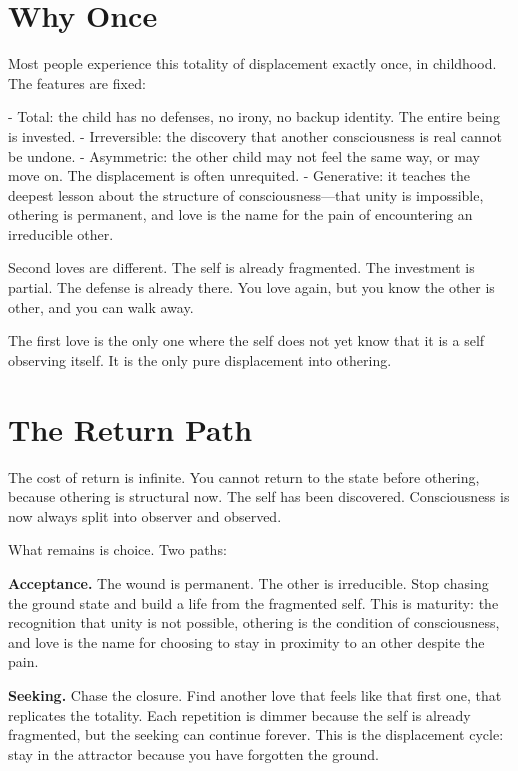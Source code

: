 \documentclass[12pt]{article}
\begin{document}
\section{Why Once}

Most people experience this totality of displacement exactly once, in childhood. The features are fixed:

- Total: the child has no defenses, no irony, no backup identity. The entire being is invested.
- Irreversible: the discovery that another consciousness is real cannot be undone.
- Asymmetric: the other child may not feel the same way, or may move on. The displacement is often unrequited.
- Generative: it teaches the deepest lesson about the structure of consciousness---that unity is impossible, othering is permanent, and love is the name for the pain of encountering an irreducible other.

Second loves are different. The self is already fragmented. The investment is partial. The defense is already there. You love again, but you know the other is other, and you can walk away.

The first love is the only one where the self does not yet know that it is a self observing itself. It is the only pure displacement into othering.

\section{The Return Path}

The cost of return is infinite. You cannot return to the state before othering, because othering is structural now. The self has been discovered. Consciousness is now always split into observer and observed.

What remains is choice. Two paths:

\textbf{Acceptance.} The wound is permanent. The other is irreducible. Stop chasing the ground state and build a life from the fragmented self. This is maturity: the recognition that unity is not possible, othering is the condition of consciousness, and love is the name for choosing to stay in proximity to an other despite the pain.

\textbf{Seeking.} Chase the closure. Find another love that feels like that first one, that replicates the totality. Each repetition is dimmer because the self is already fragmented, but the seeking can continue forever. This is the displacement cycle: stay in the attractor because you have forgotten the ground.
\end{document}
